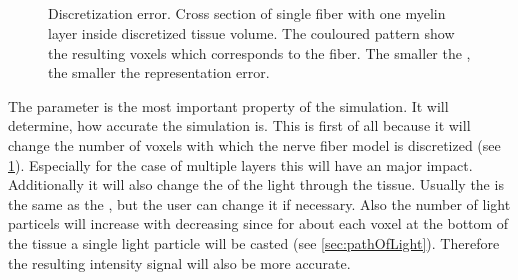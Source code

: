 \subsection{\voxelsize}
%
\begin{figure}[!t]
\centering
\setlength{\tikzwidth}{.24\textwidth}

\caption[Discretization error]{Discretization error. Cross section of single fiber with one myelin layer inside discretized tissue volume. The couloured pattern show the resulting voxels which corresponds to the fiber. The smaller the \voxelsize{}, the smaller the representation error.}
\label{fig:vectorfield_disc_error}
\end{figure}
%
The \voxelsize{} parameter is the most important property of the simulation.
It will determine, how accurate the simulation is.
This is first of all because it will change the number of voxels with which the nerve fiber model is discretized (see \cref{fig:vectorfield_disc_error}).
Especially for the case of multiple layers this will have an major impact.
Additionally it will also change the \stepsize{} of the light through the tissue.
Usually the \stepsize{} is the same as the \voxelsize{}, but the user can change it if necessary.
Also the number of light particels will increase with decreasing \voxelsize{} since for about each voxel at the bottom of the tissue a single light particle will be casted (see \cref{sec:pathOfLight}).
Therefore the resulting intensity signal will also be more accurate.
%
%
% 
